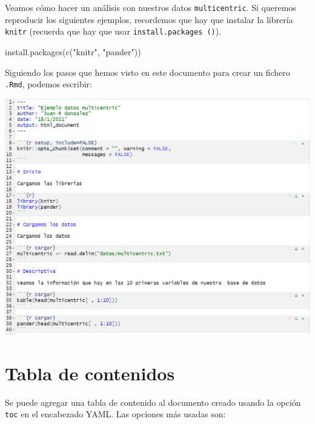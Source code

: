 \documentclass[
]{book}
\newenvironment{Shaded}{\begin{snugshade}}{\end{snugshade}}
\newcommand{\FunctionTok}[1]{\textcolor[rgb]{0.00,0.00,0.00}{#1}}
\newcommand{\NormalTok}[1]{#1}
\newcommand{\StringTok}[1]{\textcolor[rgb]{0.31,0.60,0.02}{#1}}
\begin{document}
Veamos cómo hacer un análisis con nuestros datos \texttt{multicentric}. Si queremos reproducir los siguientes ejemplos, recordemos que hay que instalar la librería \texttt{knitr} (recuerda que hay que usar \texttt{install.packages\ ()}).

\begin{Shaded}
\begin{Highlighting}[]
\FunctionTok{install.packages}\NormalTok{(}\FunctionTok{c}\NormalTok{(}\StringTok{"knitr"}\NormalTok{, }\StringTok{"pander"}\NormalTok{))}
\end{Highlighting}
\end{Shaded}

Siguiendo los pasos que hemos visto en este documento para crear un fichero \texttt{.Rmd}, podemos escribir:

\includegraphics{figures/ejemplo_markdown.png}

\hypertarget{tabla-de-contenidos}{%
\section{Tabla de contenidos}\label{tabla-de-contenidos}}

Se puede agregar una tabla de contenido al documento creado usando la opción \texttt{toc} en el encabezado YAML. Las opciones más usadas son:
\end{document}
